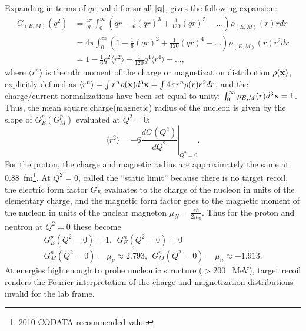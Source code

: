 Expanding in terms of $qr$,  valid for small $|{\bf q}|$, gives the following expansion:
\[
 \begin{array}{ll}G_{(E,M)}(q^2) &=\frac{4\pi}{q}\int_0^{\infty} \left(qr-\frac{1}{6}(qr)^3+\frac{1}{120}(qr)^5-...\right)\rho_{(E,M)}(r)rdr\\~&=4\pi\int_0^{\infty} \left(1-\frac{1}{6}(qr)^2+\frac{1}{120}(qr)^4-...\right)\rho_{(E,M)}(r)r^2dr\\~&=1-\frac{1}{6}q^2\langle r^2\rangle +\frac{1}{120}q^4\langle r^4\rangle-... ,\end{array}
\]
where $\langle r^n \rangle$ is the nth moment of the charge or magnetization distribution $\rho({\bf x})$, explicitly defined as $\langle r^n \rangle=\int r^n\rho({\bf x})d^3{\bf x}=\int 4\pi r^n\rho(r)r^2dr$, and the charge/current normalizations have been set equal to unity: $\int_0^{\infty} \rho_{E,M}(r)d^3{\bf x}=1$. Thus, the mean square charge(magnetic) radius of the nucleon is given by the slope of $G_{E}^p(G_{M}^p)$ evaluated at $Q^2=0$:
\begin{equation}
\langle r^2 \rangle=-6\left.\frac{dG(Q^2)}{dQ^2}\right|_{Q^2=0}.
\label{eq:proton_radius}
\end{equation}
For the proton, the charge and magnetic radius are approximately the same at 0.88~fm\footnote{2010 CODATA recommended value}.
At $Q^2=0$, called the ``static limit'' because there is no target recoil, the electric form factor $G_E$ evaluates to the charge of the nucleon in units of the elementary charge, and the magnetic form factor goes to the magnetic moment of the nucleon in units of the nuclear magneton $\mu_N=\frac{e\hbar}{2m_p}$. Thus for the proton and neutron at $Q^2=0$ these become
\[
\begin{array}{cc}G_E^p(Q^2=0)=1, ~~G_E^n(Q^2=0)=0\\G_M^n(Q^2=0)=\mu_p\approx2.793, ~~G_M^n(Q^2=0)=\mu_n\approx-1.913.\end{array}
\]
At energies high enough to probe nucleonic structure ($>200$~ MeV), target recoil renders the Fourier interpretation of the charge and magnetization distributions invalid for the lab frame. 

